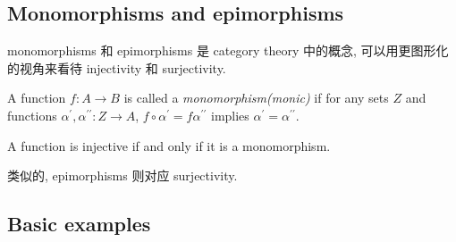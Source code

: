 \subsection{Monomorphisms and epimorphisms}\label{sec:1.2.6}

monomorphisms 和 epimorphisms 是 category theory 中的概念, 可以用更图形化的视角来看待 injectivity 和 surjectivity.

A function $f: A \to B$ is called a \emph{monomorphism(monic)} if for any sets $Z$ and functions $\alpha^{\prime}, \alpha^{\prime\prime}: Z \to A$, $f \circ \alpha^{\prime} = f \alpha^{\prime\prime}$ implies $\alpha^{\prime}= \alpha^{\prime\prime}$.

\begin{proposition}
    A function is injective if and only if it is a monomorphism.
\end{proposition}

类似的, epimorphisms 则对应 surjectivity.

\subsection{Basic examples}\label{sec:1.2.7}

